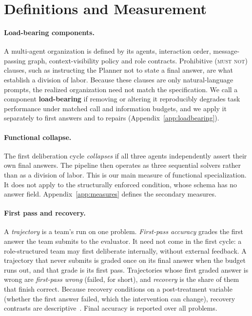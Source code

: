 \section{Definitions and Measurement}
\label{sec:framework}

\paragraph{Load-bearing components.} A multi-agent organization is defined
by its agents, interaction order, message-passing graph, context-visibility
policy and role contracts. Prohibitive (\textsc{must not}) clauses, such as
instructing the Planner not to state a final answer, are what establish a
division of labor. Because these clauses are only natural-language prompts,
the realized organization need not match the specification. We call a
component \textbf{load-bearing} if removing or altering it reproducibly
degrades task performance under matched call and information budgets, and we apply it separately to first answers and to repairs
(Appendix~\ref{app:loadbearing}).

\paragraph{Functional collapse.} The first deliberation cycle
\emph{collapses} if all three agents independently assert their own final
answers. The pipeline then operates as three sequential solvers rather than
as a division of labor. This is our main measure of functional
specialization. It does not apply to the structurally enforced condition,
whose schema has no answer field. Appendix~\ref{app:measures} defines the
secondary measures.

\paragraph{First pass and recovery.} A \emph{trajectory} is a team's run on
one problem. \emph{First-pass accuracy} grades the first answer the team
submits to the evaluator. It need not come in the first cycle: a
role-structured team may first deliberate internally, without external
feedback. A trajectory that never
submits is graded once on its final answer when the budget runs out, and
that grade is its first pass. Trajectories whose first graded answer is
wrong are \emph{first-pass wrong} (failed, for short), and \emph{recovery} is the share of them
that finish correct. Because recovery conditions on a post-treatment
variable (whether the first answer failed, which the intervention can
change), recovery contrasts are descriptive~\cite{montgomery2018conditioning}.
Final accuracy is reported over all problems.
